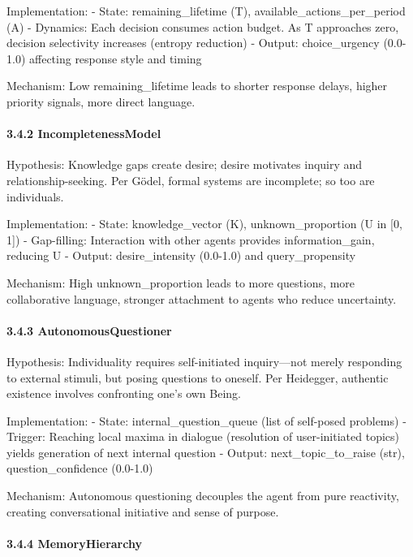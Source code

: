 \documentclass[
]{article}
\begin{document}
Implementation: - State: remaining\_lifetime (T),
available\_actions\_per\_period (A) - Dynamics: Each decision consumes
action budget. As T approaches zero, decision selectivity increases
(entropy reduction) - Output: choice\_urgency (0.0-1.0) affecting
response style and timing

Mechanism: Low remaining\_lifetime leads to shorter response delays,
higher priority signals, more direct language.

\hypertarget{incompletenessmodel}{%
\paragraph{3.4.2 IncompletenessModel}\label{incompletenessmodel}}

Hypothesis: Knowledge gaps create desire; desire motivates inquiry and
relationship-seeking. Per Gödel, formal systems are incomplete; so too
are individuals.

Implementation: - State: knowledge\_vector (K), unknown\_proportion (U
in {[}0, 1{]}) - Gap-filling: Interaction with other agents provides
information\_gain, reducing U - Output: desire\_intensity (0.0-1.0) and
query\_propensity

Mechanism: High unknown\_proportion leads to more questions, more
collaborative language, stronger attachment to agents who reduce
uncertainty.

\hypertarget{autonomousquestioner}{%
\paragraph{3.4.3 AutonomousQuestioner}\label{autonomousquestioner}}

Hypothesis: Individuality requires self-initiated inquiry---not merely
responding to external stimuli, but posing questions to oneself. Per
Heidegger, authentic existence involves confronting one's own Being.

Implementation: - State: internal\_question\_queue (list of self-posed
problems) - Trigger: Reaching local maxima in dialogue (resolution of
user-initiated topics) yields generation of next internal question -
Output: next\_topic\_to\_raise (str), question\_confidence (0.0-1.0)

Mechanism: Autonomous questioning decouples the agent from pure
reactivity, creating conversational initiative and sense of purpose.

\hypertarget{memoryhierarchy}{%
\paragraph{3.4.4 MemoryHierarchy}\label{memoryhierarchy}}
\end{document}
